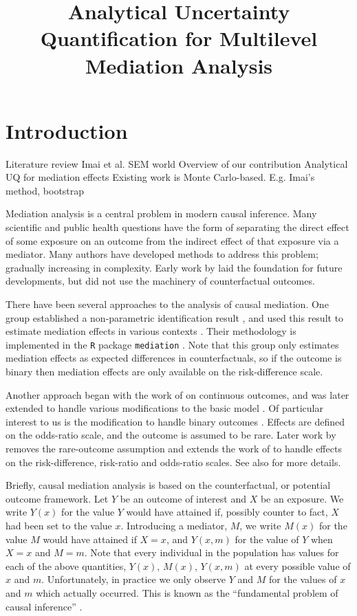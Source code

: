 \documentclass{article}
\title{Analytical Uncertainty Quantification for Multilevel Mediation Analysis}
\begin{document}
\maketitle

\section{Introduction}

\begin{outline}
    \1 Literature review
        \2 \citeauthor{Sam23}
        \2 Imai et al.
        \2 SEM world
    \1 Overview of our contribution
        \2 Analytical UQ for mediation effects
        \2 Existing work is Monte Carlo-based. E.g. Imai's method, bootstrap
\end{outline}

Mediation analysis is a central problem in modern causal inference. Many scientific and public health questions have the form of separating the direct effect of some exposure on an outcome from the indirect effect of that exposure via a mediator. Many authors have developed methods to address this problem; gradually increasing in complexity. Early work by \citet{Bar86} laid the foundation for future developments, but did not use the machinery of counterfactual outcomes. 

There have been several approaches to the analysis of causal mediation. One group established a non-parametric identification result \citep{Ima10II}, and used this result to estimate mediation effects in various contexts \citep{Ima10I, Ima11}. Their methodology is implemented in the \texttt{R} package \texttt{mediation} \citep{Tin14}. Note that this group only estimates mediation effects as expected differences in counterfactuals, so if the outcome is binary then mediation effects are only available on the risk-difference scale.

Another approach began with the work of \citet{Van09} on continuous outcomes, and was later extended to handle various modifications to the basic model \citep{Van10, Van13, Van14}. Of particular interest to us is the modification to handle binary outcomes \citep{Van10}. Effects are defined on the odds-ratio scale, and the outcome is assumed to be rare. Later work by \citet{Sam21} removes the rare-outcome assumption and extends the work of \citet{Van09} to handle effects on the risk-difference, risk-ratio and odds-ratio scales. See also \citet{Sam18,Sam23} for more details.

Briefly, causal mediation analysis is based on the counterfactual, or potential outcome framework. Let $Y$ be an outcome of interest and $X$ be an exposure. We write $Y(x)$ for the value $Y$ would have attained if, possibly counter to fact, $X$ had been set to the value $x$. Introducing a mediator, $M$, we write $M(x)$ for the value $M$ would have attained if $X=x$, and $Y(x, m)$ for the value of $Y$ when $X=x$ and $M=m$. Note that every individual in the population has values for each of the above quantities, $Y(x)$, $M(x)$, $Y(x,m)$ at every possible value of $x$ and $m$. Unfortunately, in practice we only observe $Y$ and $M$ for the values of $x$ and $m$ which actually occurred. This is known as the ``fundamental problem of causal inference'' \citep{Din18, Hol86}. 
\end{document}

